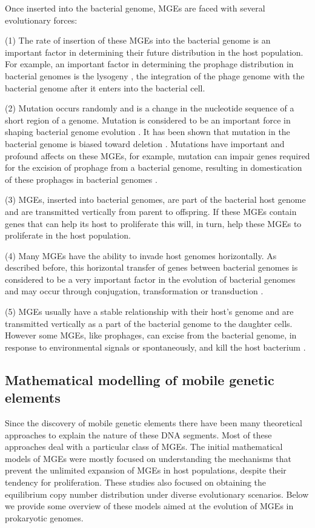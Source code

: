  Once inserted into the bacterial genome, MGEs are faced with several evolutionary forces:
 
 (1) The rate of insertion of these MGEs into the bacterial genome is an important factor in determining their future distribution in the host population. For example, an important factor in determining the prophage distribution in bacterial genomes is the lysogeny \cite{bobay_pervasive_2014}, the integration of the phage genome with the bacterial genome after it enters into the bacterial cell.
 
(2) Mutation occurs randomly and is a change in the nucleotide sequence of a short region of a genome. Mutation is considered to be an important force in shaping bacterial genome evolution \cite{hershberg_mutationengine_2015}. It has been shown that mutation in the bacterial genome is biased toward deletion \cite{kuo_deletional_2009}.  Mutations have important and profound affects on these MGEs, for example, mutation can impair genes required for the excision of prophage from a bacterial genome, resulting in domestication of these prophages in bacterial genomes \cite{casjens_prophages_2003, wang_cryptic_2010}.

(3) MGEs, inserted into bacterial genomes, are part of the bacterial host genome and are transmitted vertically from parent to offspring. If these MGEs contain genes that can help its host to proliferate this will, in turn, help these MGEs to proliferate in the host population. 

(4) Many MGEs have the ability to invade host genomes horizontally. As described before, this horizontal transfer of genes between bacterial genomes is considered to be a very important factor in the evolution of bacterial genomes and may occur through conjugation, transformation or transduction  \cite{soucy_horizontal_2015}.

(5) MGEs usually have a stable relationship with their host's genome and are transmitted vertically as a part of the bacterial genome to the daughter cells. However some MGEs, like prophages, can excise from the bacterial genome, in response to environmental signals or spontaneously, and kill the host bacterium \cite{lopez_induction_2014}. 

\subsection{Mathematical modelling of mobile genetic elements}
Since the discovery of mobile genetic elements there have been many theoretical approaches to explain the nature of these DNA segments. Most of these approaches deal with a particular class of MGEs. The initial mathematical models of MGEs were mostly focused on understanding the mechanisms that prevent the unlimited expansion of MGEs in host populations, despite their tendency for proliferation. These studies also focused on obtaining the equilibrium copy number distribution under diverse evolutionary scenarios. Below we provide some overview of these models aimed at the evolution of MGEs in prokaryotic genomes.

